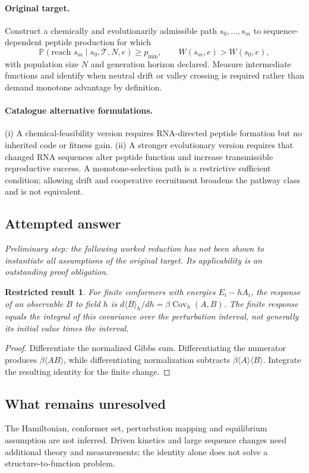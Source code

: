\documentclass[11pt]{article}
\newcommand{\Prob}{\mathbb P}
\providecommand{\Prob}{\mathbb P}
\newtheorem{attemptresult}{Restricted result}[section]
\begin{document}
\paragraph{Original target.}
Construct a chemically and evolutionarily admissible path $s_0,\ldots,s_m$ to sequence-dependent peptide production for which
\[
\Prob(\text{reach }s_m\mid s_0,\mathcal T,N,e)\geq p_{\min},
\qquad W(s_m,e)>W(s_0,e),
\]
with population size $N$ and generation horizon declared. Measure intermediate functions and identify when neutral drift or valley crossing is required rather than demand monotone advantage by definition.
\paragraph{Catalogue alternative formulations.}
(i) A chemical-feasibility version requires RNA-directed peptide formation but no inherited code or fitness gain. (ii) A stronger evolutionary version requires that changed RNA sequences alter peptide function and increase transmissible reproductive success. A monotone-selection path is a restrictive sufficient condition; allowing drift and cooperative recruitment broadens the pathway class and is not equivalent.
\subsection{Attempted answer}
\noindent\emph{Preliminary step: the following worked reduction has not been shown to instantiate all assumptions of the original target. Its applicability is an outstanding proof obligation.}

\begin{attemptresult}
For finite conformers with energies $E_i-hA_i$, the response of an observable $B$ to field $h$ is $d\langle B\rangle_h/dh=\beta\operatorname{Cov}_h(A,B)$. The finite response equals the integral of this covariance over the perturbation interval, not generally its initial value times the interval.
\end{attemptresult}
\begin{proof}
Differentiate the normalized Gibbs sum. Differentiating the numerator produces $\beta\langle AB\rangle$, while differentiating normalization subtracts $\beta\langle A\rangle\langle B\rangle$. Integrate the resulting identity for the finite change.
\end{proof}
\subsection{What remains unresolved}
The Hamiltonian, conformer set, perturbation mapping and equilibrium assumption are not inferred. Driven kinetics and large sequence changes need additional theory and measurements; the identity alone does not solve a structure-to-function problem.
\end{document}

